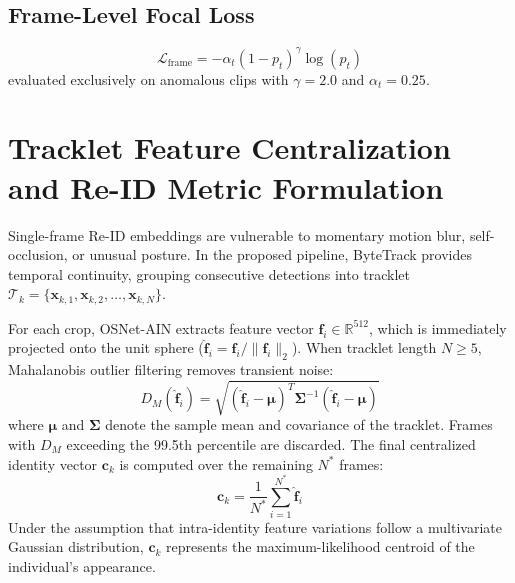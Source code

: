 \documentclass[12pt,a4paper]{report}
\begin{document}
\subsection{Frame-Level Focal Loss}
\begin{equation}
    \mathcal{L}_{\text{frame}} = - \alpha_t (1 - p_t)^\gamma \log(p_t)
\end{equation}
evaluated exclusively on anomalous clips with $\gamma = 2.0$ and $\alpha_t = 0.25$.

\section{Tracklet Feature Centralization and Re-ID Metric Formulation}
\enlargethispage{\baselineskip}
{\setlength{\abovedisplayskip}{5pt}
\setlength{\belowdisplayskip}{5pt}
\setlength{\abovedisplayshortskip}{3pt}
\setlength{\belowdisplayshortskip}{3pt}
Single-frame Re-ID embeddings are vulnerable to momentary motion blur, self-occlusion, or unusual posture. In the proposed pipeline, ByteTrack provides temporal continuity, grouping consecutive detections into tracklet $\mathcal{T}_k = \{\mathbf{x}_{k, 1}, \mathbf{x}_{k, 2}, \dots, \mathbf{x}_{k, N}\}$.

For each crop, OSNet-AIN extracts feature vector $\mathbf{f}_i \in \mathbb{R}^{512}$, which is immediately projected onto the unit sphere ($\hat{\mathbf{f}}_i = \mathbf{f}_i / \|\mathbf{f}_i\|_2$). When tracklet length $N \ge 5$, Mahalanobis outlier filtering removes transient noise:
\begin{equation}
    D_M(\hat{\mathbf{f}}_i) = \sqrt{(\hat{\mathbf{f}}_i - \boldsymbol{\mu})^T \boldsymbol{\Sigma}^{-1} (\hat{\mathbf{f}}_i - \boldsymbol{\mu})}
\end{equation}
where $\boldsymbol{\mu}$ and $\boldsymbol{\Sigma}$ denote the sample mean and covariance of the tracklet. Frames with $D_M$ exceeding the 99.5th percentile are discarded. The final centralized identity vector $\mathbf{c}_k$ is computed over the remaining $N^*$ frames:
\begin{equation}
    \mathbf{c}_k = \frac{1}{N^*} \sum_{i=1}^{N^*} \hat{\mathbf{f}}_i
\end{equation}
Under the assumption that intra-identity feature variations follow a multivariate Gaussian distribution, $\mathbf{c}_k$ represents the maximum-likelihood centroid of the individual's appearance.

}
\end{document}
